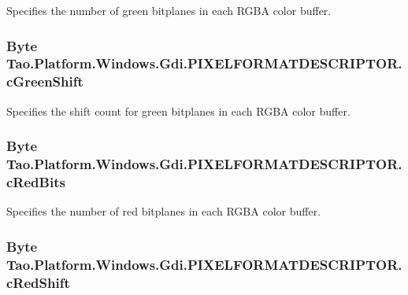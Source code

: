Specifies the number of green bitplanes in each RGBA color buffer. 

\hypertarget{struct_tao_1_1_platform_1_1_windows_1_1_gdi_1_1_p_i_x_e_l_f_o_r_m_a_t_d_e_s_c_r_i_p_t_o_r_a1acaf61f35f3eb8f1ea75c890b764580}{
\subsubsection[{cGreenShift}]{\setlength{\rightskip}{0pt plus 5cm}Byte {\bf Tao.Platform.Windows.Gdi.PIXELFORMATDESCRIPTOR.cGreenShift}}}
\label{struct_tao_1_1_platform_1_1_windows_1_1_gdi_1_1_p_i_x_e_l_f_o_r_m_a_t_d_e_s_c_r_i_p_t_o_r_a1acaf61f35f3eb8f1ea75c890b764580}


Specifies the shift count for green bitplanes in each RGBA color buffer. 

\hypertarget{struct_tao_1_1_platform_1_1_windows_1_1_gdi_1_1_p_i_x_e_l_f_o_r_m_a_t_d_e_s_c_r_i_p_t_o_r_a71b6b8de02a741921530818f08a2be88}{
\subsubsection[{cRedBits}]{\setlength{\rightskip}{0pt plus 5cm}Byte {\bf Tao.Platform.Windows.Gdi.PIXELFORMATDESCRIPTOR.cRedBits}}}
\label{struct_tao_1_1_platform_1_1_windows_1_1_gdi_1_1_p_i_x_e_l_f_o_r_m_a_t_d_e_s_c_r_i_p_t_o_r_a71b6b8de02a741921530818f08a2be88}


Specifies the number of red bitplanes in each RGBA color buffer. 

\hypertarget{struct_tao_1_1_platform_1_1_windows_1_1_gdi_1_1_p_i_x_e_l_f_o_r_m_a_t_d_e_s_c_r_i_p_t_o_r_afee35f417dfd8608e8c0690107ebab3b}{
\subsubsection[{cRedShift}]{\setlength{\rightskip}{0pt plus 5cm}Byte {\bf Tao.Platform.Windows.Gdi.PIXELFORMATDESCRIPTOR.cRedShift}}}
\label{struct_tao_1_1_platform_1_1_windows_1_1_gdi_1_1_p_i_x_e_l_f_o_r_m_a_t_d_e_s_c_r_i_p_t_o_r_afee35f417dfd8608e8c0690107ebab3b}


